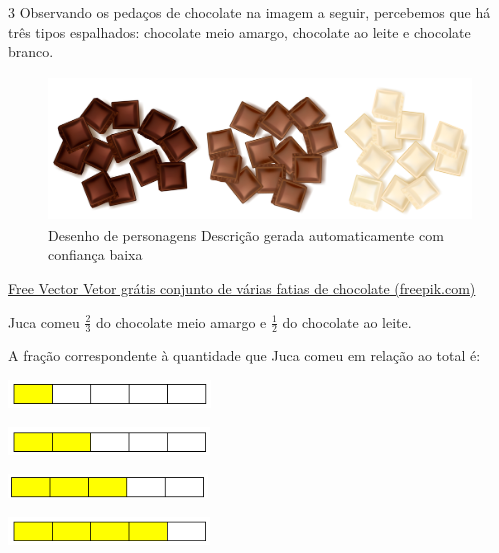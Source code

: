 {{

\num{3} Observando os pedaços de chocolate na imagem a seguir, percebemos 
que há três tipos espalhados: chocolate meio amargo, chocolate ao leite e
chocolate branco. 

\begin{figure}
\centering
\includegraphics[width=4.54097in,height=1.51544in]{./_SAEB_9_MAT/media/image53.png}
\caption{Desenho de personagens Descrição gerada automaticamente com
confiança baixa}
\end{figure}

\href{https://br.freepik.com/vetores-gratis/conjunto-de-varias-fatias-de-chocolate_10155086.htm\#page=2\&query=chocolate\&position=49\&from_view=search\&track=sph}{Free
Vector \textbar{} Vetor grátis conjunto de várias fatias de chocolate
(freepik.com)}

Juca comeu $\frac{2}{3}$ do chocolate meio amargo e $\frac{1}{2}$ do
chocolate ao leite.

A fração correspondente à quantidade que Juca comeu em relação ao total
é:

\begin{escolha}

\item
  \includegraphics[width=2.11685in,height=0.29169in]{./_SAEB_9_MAT/media/image54.png}
\item
  \includegraphics[width=2.10852in,height=0.30003in]{./_SAEB_9_MAT/media/image55.png}
\item
  \includegraphics[width=2.08351in,height=0.25002in]{./_SAEB_9_MAT/media/image56.png}
\item
  \includegraphics[width=2.10852in,height=0.30003in]{./_SAEB_9_MAT/media/image57.png}
\end{escolha}

}}
